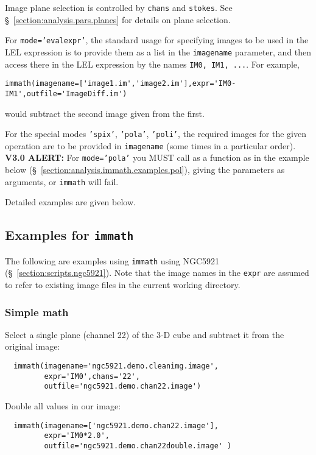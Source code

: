 Image plane selection is controlled by {\tt chans} and {\tt stokes}.
See \S~\ref{section:analysis.pars.planes} for details on plane
selection.

For {\tt mode='evalexpr'}, the standard usage for specifying images to
be used in the LEL expression is to provide them as a list in the {\tt imagename}
parameter, and then access there in the LEL expression by the
names {\tt IM0, IM1, ...}.  For example,
\small
\begin{verbatim}
immath(imagename=['image1.im','image2.im'],expr='IM0-IM1',outfile='ImageDiff.im')
\end{verbatim}
\normalsize
would subtract the second image given from the first.

For the special modes {\tt 'spix'}, {\tt 'pola'}, {\tt 'poli'}, the
required images for the given operation are to be provided in 
{\tt imagename} (some times in a particular order). 
{\bf V3.0 ALERT:} For {\tt mode='pola'} you MUST call as a function as
in the example below (\S~\ref{section:analysis.immath.examples.pol}), 
giving the parameters as arguments, or {\tt immath} will fail.

Detailed examples are given below.

\subsection{Examples for {\tt immath}}
\label{section:analysis.immath.examples}

The following are examples using {\tt immath} using NGC5921 
(\S~\ref{section:scripts.ngc5921}).  Note that the image
names in the {\tt expr} are assumed to refer to existing image files
in the current working directory.

\subsubsection{Simple math}
\label{section:analysis.immath.examples.math}

Select a single plane (channel 22) of the 3-D cube and  
subtract it from the original image: 
\small
\begin{verbatim}
  immath(imagename='ngc5921.demo.cleanimg.image',
         expr='IM0',chans='22',
         outfile='ngc5921.demo.chan22.image')
\end{verbatim}
\normalsize

Double all values in our image:
\small
\begin{verbatim}
  immath(imagename=['ngc5921.demo.chan22.image'],
         expr='IM0*2.0',
         outfile='ngc5921.demo.chan22double.image' )
\end{verbatim}
\normalsize
    
